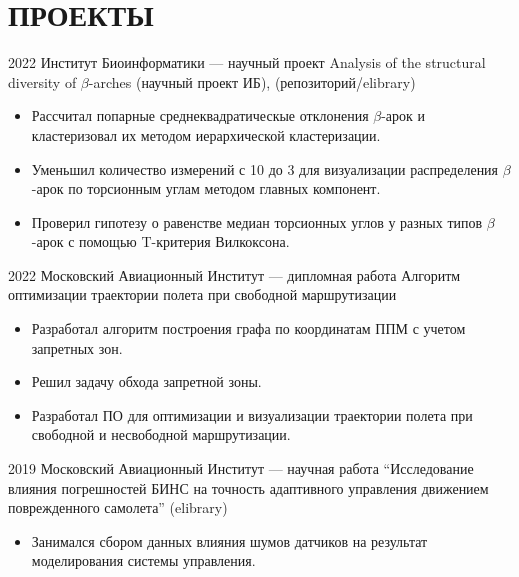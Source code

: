 \section{ПРОЕКТЫ}

    \project
    {2022}
    {Институт Биоинформатики — научный проект}
    {Analysis of the structural diversity of $\beta$-arches (научный проект ИБ), (репозиторий/elibrary)}
    {
        \begin{itemize}
            \setlength\itemsep{-.5em}
            \item Рассчитал попарные среднеквадратическые отклонения $\beta$-арок и кластеризовал их методом иерархической кластеризации.
            \item Уменьшил количество измерений с 10 до 3 для визуализации распределения $\beta$-арок по торсионным углам методом главных компонент.
            \item Проверил гипотезу о равенстве медиан торсионных углов у разных типов $\beta$-арок с помощью T-критерия Вилкоксона.
        \end{itemize}
    }
    
    \project
    {2022}
    {Московский Авиационный Институт — дипломная работа}
    {Алгоритм оптимизации траектории полета при свободной маршрутизации}
    {
        \begin{itemize}
            \setlength\itemsep{-.5em}
            \item Разработал алгоритм построения графа по координатам ППМ с учетом запретных зон.
            \item Решил задачу обхода запретной зоны.
            \item Разработал ПО для оптимизации и визуализации траектории полета при свободной и несвободной маршрутизации.
        \end{itemize}
    }
    
    \project
    {2019}
    {Московский Авиационный Институт — научная работа}
    {“Исследование влияния погрешностей БИНС на точность адаптивного управления движением поврежденного самолета” (elibrary)}
    {
        \begin{itemize}
            \setlength\itemsep{-.5em}
            \item Занимался сбором данных влияния шумов датчиков на результат моделирования системы управления.
        \end{itemize}
    }
